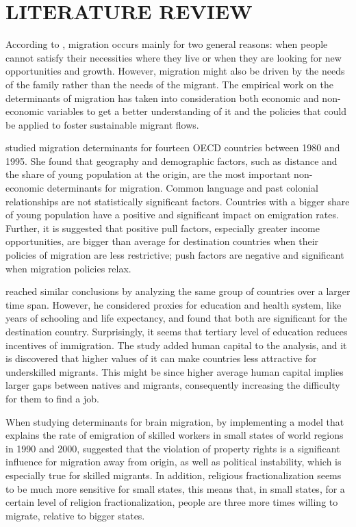 \documentclass[../main.tex]{subfiles}
\begin{document}
\section{LITERATURE REVIEW}
According to \textcite{Amrith.2014}, migration occurs mainly for two general reasons: when people cannot satisfy their necessities where they live or when they are looking for new opportunities and growth. However, migration might also be driven by the needs of the family rather than the needs of the migrant. The empirical work on the determinants of migration has taken into consideration both economic and non-economic variables to get a better understanding of it and the policies that could be applied to foster sustainable migrant flows. 

\textcite{Mayda.2005} studied migration determinants for fourteen OECD countries between 1980 and 1995. She found that geography and demographic factors, such as distance and the share of young population at the origin, are the most important non-economic determinants for migration. Common language and past colonial relationships are not statistically significant factors. Countries with a bigger share of young population have a positive and significant impact on emigration rates. Further, it is suggested that positive pull factors, especially greater income opportunities, are bigger than average for destination countries when their policies of migration are less restrictive; push factors are negative and significant when migration policies relax. 

\textcite{Wesselbaum.2018} reached similar conclusions by analyzing the same group of countries over a larger time span. However, he considered proxies for education and health system, like years of schooling and life expectancy, and found that both are significant for the destination country. Surprisingly, it seems that tertiary level of education reduces incentives of immigration. The study added human capital to the analysis, and it is discovered that higher values of it can make countries less attractive for underskilled migrants. This might be since higher average human capital implies larger gaps between natives and migrants, consequently increasing the difficulty for them to find a job. 

When studying determinants for brain migration, by implementing a model that explains the rate of emigration of skilled workers in small states of world regions in 1990 and 2000, \textcite{Beine.2008} suggested that the violation of property rights is a significant influence for migration away from origin, as well as political instability, which is especially true for skilled migrants. In addition, religious fractionalization seems to be much more sensitive for small states, this means that, in small states, for a certain level of religion fractionalization, people are three more times willing to migrate, relative to bigger states. 
\end{document}
